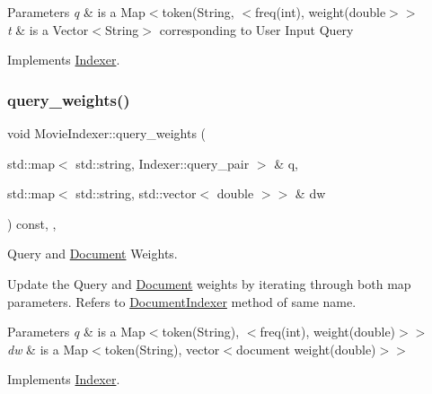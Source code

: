 \begin{DoxyParams}{Parameters}
{\em q} & is a Map$<$token(String, $<$freq(int), weight(double$>$$>$ \\
\hline
{\em t} & is a Vector$<$\+String$>$ corresponding to User Input Query \\
\hline
\end{DoxyParams}


Implements \hyperlink{class_indexer_a0587f6a4d61620219473bf583ecdbad5}{Indexer}.

\mbox{\label{class_movie_indexer_a7a01d72125aa96e5d286a2bd0cb13ab8}} 
\subsubsection{\texorpdfstring{query\+\_\+weights()}{query\_weights()}}
{\footnotesize\ttfamily void Movie\+Indexer\+::query\+\_\+weights (\begin{DoxyParamCaption}\item[{std\+::map$<$ std\+::string, Indexer\+::query\+\_\+pair $>$ \&}]{q,  }\item[{std\+::map$<$ std\+::string, std\+::vector$<$ double $>$$>$ \&}]{dw }\end{DoxyParamCaption}) const\hspace{0.3cm}{\ttfamily [override]}, {\ttfamily [private]}, {\ttfamily [virtual]}}



Query and \hyperlink{class_document}{Document} Weights. 

Update the Query and \hyperlink{class_document}{Document} weights by iterating through both map parameters. Refers to \hyperlink{class_document_indexer}{Document\+Indexer} method of same name.


\begin{DoxyParams}{Parameters}
{\em q} & is a Map$<$token(\+String), $<$freq(int), weight(double)$>$$>$ \\
\hline
{\em dw} & is a Map$<$token(\+String), vector$<$document weight(double)$>$$>$ \\
\hline
\end{DoxyParams}


Implements \hyperlink{class_indexer_a74819336b6d9883483c09349ebdf43b8}{Indexer}.

\mbox{\label{class_movie_indexer_a16a32702b061de5e38110801f80a7bc9}} 
